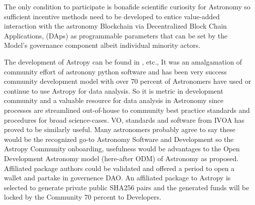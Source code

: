 \documentclass[final,5p,times,twocolumn,authoryear]{elsarticle}
\begin{document}
The only condition to participate is bonafide scientific curiosity for Astronomy so sufficient incentive methods need to be developed to entice value-added interaction with the astronomy Blockchain via Decentralized Block Chain Applications, (DAps) as programmable parameters that can be set by the Model's governance component albeit individual minority actors. 


The development of Astropy  can be found in \cite{robitaille_astropy:_2013}, etc.,  It was an amalgamation of community effort of astronony python software and has been very success community development model with over 70 percent of Astronomers have used or continue to use Astropy for data analysis. So it is metric in development community and a valuable resource for data analysis in Astronomy since processes are streamlined out-of-house to community best practice standards and procedures for broad science-cases. VO, standards and software from IVOA has proved to be similarly useful. Many astronomers probably agree to say these would be the recognized go-to  Astronomy Software and Development so the Astropy Community onboarding, usefulness would be advantages to the Open Development Astronomy model (here-after ODM) of Astronomy as proposed. Affiliated package authors could be validated and offered a period to open a wallet and partake in governence DAO. An affiliated package to Astropy is selected to generate private public SHA256 pairs and the generated funds will be locked by the Community 70 percent to Developers. 
\end{document}
